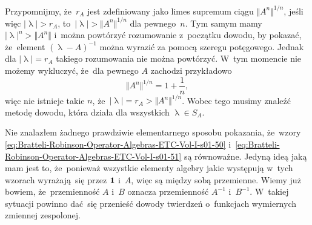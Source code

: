 \documentclass[a4paper,11pt]{article}
\numberwithin{equation}{section}
\renewcommand{\lambda}{\uplambda}
\begin{document}
Przypomnijmy, że~$r_{ A }$ jest zdefiniowany jako limes supremum ciągu
$\Vert A^{ n }\Vert^{ 1 / n }$, jeśli więc $| \lambda | > r_{ A }$,
to~$| \lambda | > \Vert A^{ n } \Vert^{ 1 / n }$ dla pewnego~$n$. Tym samym mamy
$| \lambda |^{ n } > \Vert A^{ n } \Vert$ i~można powtórzyć rozumowanie z~początku dowodu,
by pokazać, że~element $( \lambda - A )^{ -1 }$ można wyrazić za pomocą szeregu
potęgowego. Jednak dla $| \lambda | = r_{ A }$ takiego rozumowania nie można
powtórzyć. W~tym momencie nie możemy wykluczyć, że~dla pewnego $A$ zachodzi
przykładowo
\begin{equation}
  \label{eq:Bratteli-Robinson-Operator-Algebras-ETC-Vol-I-s01-52}
  \Vert A^{ n } \Vert^{ 1 / n } = 1 + \frac{ 1 }{ n },
\end{equation}
więc nie istnieje takie $n$, że~$| \lambda | = r_{ A } > \Vert A^{ n } \Vert^{ 1 / n }$.
Wobec tego musimy znaleźć metodę dowodu, która działa dla wszystkich
$\lambda \in S_{ A }$.

Nie znalazłem żadnego prawdziwie elementarnego sposobu pokazania,
że~wzory \eqref{eq:Bratteli-Robinson-Operator-Algebras-ETC-Vol-I-s01-50}
i~\eqref{eq:Bratteli-Robinson-Operator-Algebras-ETC-Vol-I-s01-51} są
równoważne. Jedyną ideą jaką mam jest to, że~ponieważ wszystkie elementy
algebry jakie występują w~tych wzorach wyrażają~się przez $\mathbf{1}$ i~$A$,
więc są między sobą przemienne. Wiemy już bowiem, że~przemienność $A$ i~$B$
oznacza przemienność $A^{ -1 }$ i~$B^{ -1 }$. W~takiej sytuacji powinno
dać~się przenieść dowody twierdzeń o~funkcjach wymiernych zmiennej
zespolonej.
\end{document}
